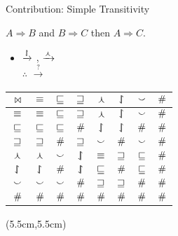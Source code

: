\def\joinTable#1{
  \begin{tabular}{|c||c|c|c|c|c|c|c|}
    \hline
    $\bowtie$ & $\equivalent$ & $\forward$ & $\reverse$ & $\negate$ & $\alternate$ & $\cover$ & $\independent$ \\
    \hline
    $\equivalent$ & $\equivalent$ & $\forward$ & $\reverse$ & $\negate$ & $\alternate$ & $\cover$ & $\independent$ \\
    $\forward$ & $\forward$ & $\forward$ & $\independent$ & $\alternate$ & $\alternate$ & $\independent$ & $\independent$ \\
    $\reverse$ & $\reverse$ & $\independent$ & $\reverse$ & $\cover$ & $\independent$ & $\cover$ & $\independent$  \\
    $\negate$ & $\negate$ & $\cover$ & $\alternate$ & $\equivalent$ & $\reverse$ & $\forward$ & $\independent$  \\
    $\alternate$ & $\alternate$ & $\independent$ & $\alternate$ & \textcolor<#1-#1>{darkred}{$\forward$} & $\independent$ & $\forward$ & $\independent$  \\
    $\cover$ & $\cover$ & $\cover$ & $\independent$ & $\reverse$ & $\reverse$ & $\independent$ & $\independent$  \\
    $\independent$ & $\independent$ & $\independent$ & $\independent$ & $\independent$ & $\independent$ & $\independent$ & $\independent$ \\
    \hline
	\end{tabular}
}

\def\title{Contribution: Simple Transitivity}
\begin{frame}[noframenumbering]{\title}

   $A \Rightarrow B$ and $B \Rightarrow C$ then $A \Rightarrow C$. \\
  \vspace{0.5cm}
  \pause
  \begin{itemize}
    \item 
       $\xrightarrow{\downharpoonleft\hspace{-1.25mm}\upharpoonright}$ , \hspace{0.5cm}
       $\xrightarrow{\curlywedge}$  \\
      $\therefore$  \hspace{0.1cm}
       $\xrightarrow{?}$ 
  \end{itemize}
  \pause

  \begin{center}
    \joinTable{4}
  \end{center}
  \pause
  \pause

  \begin{textblock*}{2cm}(5.5cm,5.5cm)
  \end{textblock*}
\end{frame}

